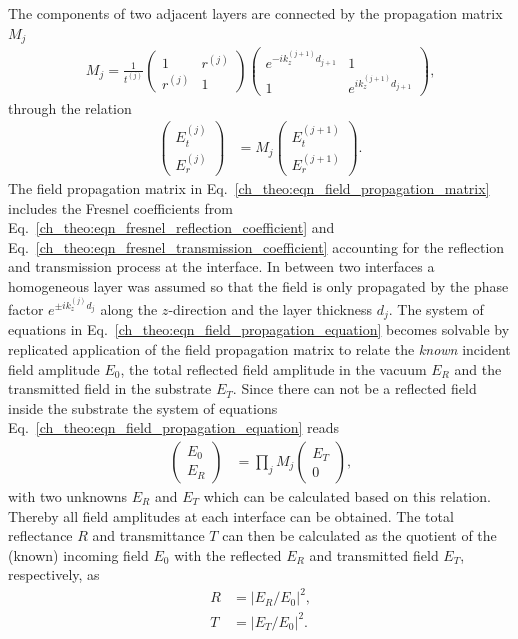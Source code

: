 The components of two adjacent layers are connected by the propagation matrix $M_j$
\begin{align}
M_j = \frac{1}{t^{(j)}}
\begin{pmatrix}
1 & r^{(j)} \\
r^{(j)} & 1
\end{pmatrix}
\begin{pmatrix}
e^{-i k_z^{(j+1)} d_{j+1}} & 1 \\
1 & e^{i k_z^{(j+1)} d_{j+1}}
\end{pmatrix}
\text{,} \label{ch_theo:eqn_field_propagation_matrix}
\end{align}
through the relation
\begin{align}
\begin{pmatrix}
E^{(j)}_t \\
E^{(j)}_r
\end{pmatrix} &=
M_j
\begin{pmatrix}
E^{(j+1)}_t \\
E^{(j+1)}_r
\end{pmatrix} \text{.} \label{ch_theo:eqn_field_propagation_equation}
\end{align}
The field propagation matrix in Eq.~\eqref{ch_theo:eqn_field_propagation_matrix} includes the Fresnel coefficients from Eq.~\eqref{ch_theo:eqn_fresnel_reflection_coefficient} and Eq.~\eqref{ch_theo:eqn_fresnel_transmission_coefficient} accounting for the reflection and transmission process at the interface. In between two interfaces a homogeneous layer was assumed so that the field is only propagated by the phase factor $e^{\pm i k_z^{(j)} d_{j}}$ along the $z$-direction and the layer thickness $d_j$. The system of equations in Eq.~\eqref{ch_theo:eqn_field_propagation_equation} becomes solvable by replicated application of the field propagation matrix to relate the \emph{known} incident field amplitude $E_0$, the total reflected field amplitude in the vacuum $E_R$ and the transmitted field in the substrate $E_T$. Since there can not be a reflected field inside the substrate the system of equations Eq.~\eqref{ch_theo:eqn_field_propagation_equation} reads
\begin{align}
\begin{pmatrix}
E_0 \\
E_R
\end{pmatrix} &=
\prod\limits_{j} M_j
\begin{pmatrix}
E_T \\
0
\end{pmatrix} \text{,} \label{eqn:field_propagation_equation}
\end{align}
with two unknowns $E_R$ and $E_T$ which can be calculated based on this relation. Thereby all field amplitudes at each interface can be obtained. The total reflectance $R$ and transmittance $T$ can then be calculated as the quotient of the (known) incoming field $E_0$ with the reflected $E_R$ and transmitted field $E_T$, respectively, as
\begin{align}
R &= |E_R/E_0|^2\text{,} \nonumber\\
T &= |E_T/E_0|^2 \text{.} \label{ch_theo:eqn_refl_trans_ML}
\end{align}

